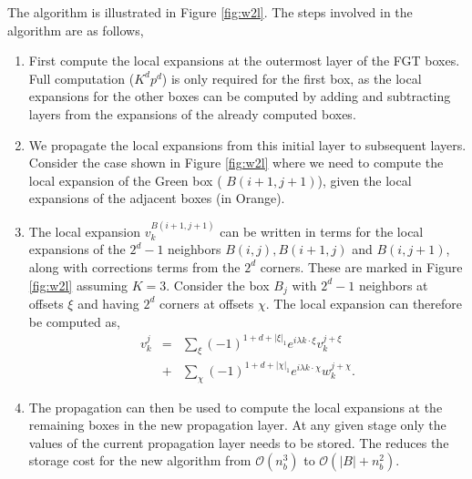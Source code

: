 The algorithm is illustrated in Figure \ref{fig:w2l}. The steps involved in the
algorithm are as follows, 
\begin{enumerate}    
  \item First compute the local expansions at the outermost layer of the FGT
    boxes. Full computation ($K^dp^d$) is only required for the first box, as
    the local expansions for the other boxes can be computed by adding and
    subtracting layers from the expansions of the already computed boxes. 
  
  \item We propagate the local expansions from this initial layer to subsequent
    layers. Consider the case shown in Figure \ref{fig:w2l} where we need to
    compute the local expansion of the Green box ( $B(i+1,j+1)$), given the
    local expansions of the adjacent boxes (in Orange).  
  
  \item The local expansion $v_k^{B(i+1, j+1)}$ can be written in terms for the
    local expansions of the $2^d -1$ neighbors $B(i,j), B(i+1,j)$ and
    $B(i,j+1)$, along with corrections terms from the $2^d$ corners.
    These are marked in Figure \ref{fig:w2l} assuming $K=3$. Consider the box $B_j$ with $2^d -1$ neighbors at offsets $\xi$ and having $2^d$ corners at offsets $\chi$. The local expansion can therefore be computed as,
    \begin{eqnarray} 
    v_k^j &=& \sum_{\xi} (-1)^{1 + d + |\xi|_1} e^{i\lambda k\cdot\xi} v_k^{j+\xi} \nonumber\\
    & +& \sum_{\chi} (-1)^{1 + d + |\chi|_1} e^{i\lambda k\cdot \chi} w_k^{j+\chi}. \label{eqn:sweep}
    \end{eqnarray}
    
  
  \item The propagation can then be used to compute the local expansions at the remaining boxes in
    the new propagation layer. At any given stage only the values of the current 
    propagation layer needs to be stored. The reduces the storage cost for the new algorithm from
    $\mathcal{O}(n_b^3)$ to $\mathcal{O}(|B| + n_b^2)$.

\end{enumerate}


